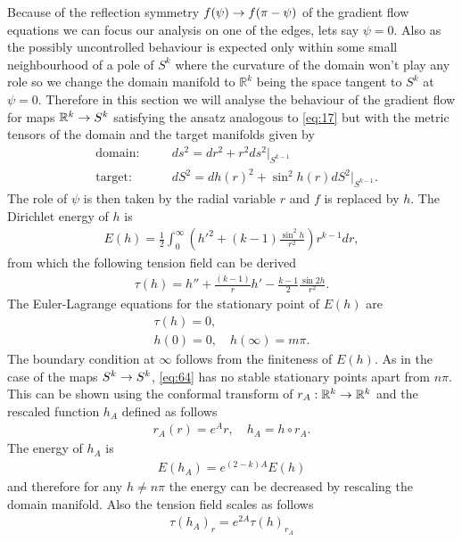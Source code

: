 Because of the reflection symmetry $f(\psi)\rightarrow f(\pi-\psi)$ of the
gradient flow equations we can focus our analysis on one of the edges,
lets say $\psi=0$. Also as the possibly uncontrolled behaviour is
expected only within some small neighbourhood of a pole of $S^k$ where
the curvature of the domain won't play any role so we change the
domain manifold to $\mathbb{R}^k$ being the space tangent to $S^k$ at
$\psi=0$. Therefore in this section we will analyse the behaviour of
the gradient flow for maps $\mathbb{R}^k\rightarrow S^k$ satisfying the ansatz
analogous to \eqref{eq:17} but with the metric tensors of the domain
and the target manifolds given by
\begin{align}\label{eq:630}
  &\text{domain:}&\quad &ds^2=dr^2+r^2ds^2\big|_{S^{k-1}}\\
  &\text{target:}&\quad &dS^2=dh(r)^2+\sin^2h(r)dS^2\big|_{S^{k-1}}.
\end{align}
The role of $\psi$ is then taken by the radial variable $r$ and $f$ is
replaced by $h$. The Dirichlet energy of $h$ is
\begin{align}
  \label{eq:64}
  E(h)=\frac{1}{2}\int_0^\infty \left(h'^2+(k-1)\frac{\sin^2
      h}{r^2}\right)r^{k-1}dr,
\end{align}
from which the following tension field can be derived
\begin{align}
  \label{eq:65}
  \tau(h)=h''+\frac{(k-1)}{r}h'-\frac{k-1}{2}\frac{\sin2h}{r^2}.
\end{align}
The Euler-Lagrange equations for the stationary point of $E(h)$ are
\begin{align}
  \label{eq:63}
  \tau(h)=0,\\
  h(0)=0,\quad h(\infty)=m\pi.
\end{align}
The boundary condition at $\infty$ follows from the finiteness of
$E(h)$. As in the case of the maps $S^k\rightarrow S^k$, \eqref{eq:64} has no
stable stationary points apart from $n\pi$. This can be shown using
the conformal transform of $r_A:\mathbb{R}^k\rightarrow\mathbb{R}^k$ and the
rescaled function $h_A$ defined as follows
\begin{align}
  \label{eq:76}
  r_A(r)=e^A r,\quad h_A=h\circ r_A.
\end{align}
The energy of $h_A$ is
\begin{align}
  \label{eq:77}
  E(h_A)=e^{(2-k)A}E(h)
\end{align}
and therefore for any $h\ne n\pi$ the energy can be decreased by
rescaling the domain manifold. Also the tension field scales as
follows
\begin{align}
  \label{eq:78}
  \tau(h_A)_r=e^{2A}\tau(h)_{r_A}
\end{align}
